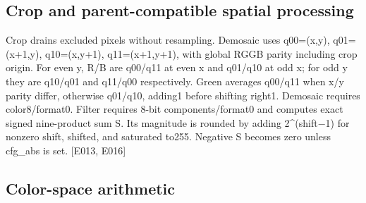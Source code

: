 \documentclass[11pt,a4paper]{article}
\begin{document}
\subsection{Crop and parent-compatible spatial processing}

Crop drains excluded pixels without resampling. Demosaic uses q00=\allowbreak{}(\allowbreak{}x,\allowbreak{}y)\allowbreak{},\allowbreak{} q01=\allowbreak{}(\allowbreak{}x+\allowbreak{}1,\allowbreak{}y)\allowbreak{},\allowbreak{} q10=\allowbreak{}(\allowbreak{}x,\allowbreak{}y+\allowbreak{}1)\allowbreak{},\allowbreak{} q11=\allowbreak{}(\allowbreak{}x+\allowbreak{}1,\allowbreak{}y+\allowbreak{}1)\allowbreak{},\allowbreak{} with global RGGB parity including crop origin. For even y,\allowbreak{} R/\allowbreak{}B are q00/\allowbreak{}q11 at even x and q01/\allowbreak{}q10 at odd x; for odd y they are q10/\allowbreak{}q01 and q11/\allowbreak{}q00 respectively. Green averages q00/\allowbreak{}q11 when x/\allowbreak{}y parity differ,\allowbreak{} otherwise q01/\allowbreak{}q10,\allowbreak{} adding1 before shifting right1. Demosaic requires color8/\allowbreak{}format0. Filter requires 8-bit components/\allowbreak{}format0 and computes exact signed nine-product sum S. Its magnitude is rounded by adding 2\textasciicircum{}(\allowbreak{}shift{\vulcanmathsymbols −}1)\allowbreak{} for nonzero shift,\allowbreak{} shifted,\allowbreak{} and saturated to255. Negative S becomes zero unless cfg\_\allowbreak{}abs is set. [\allowbreak{}E013,\allowbreak{} E016]\allowbreak{}

\subsection{Color-space arithmetic}
\end{document}
